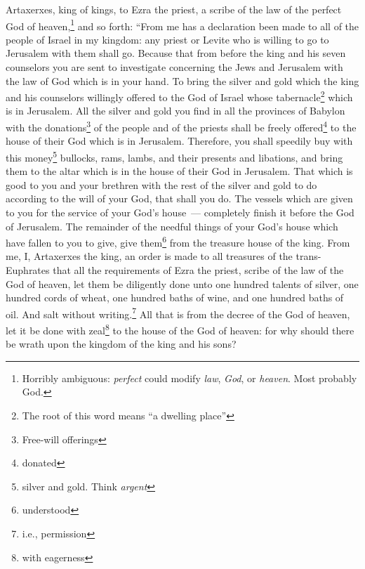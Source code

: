 
\begin{inparaenum}
     Artaxerxes, king of kings, to Ezra the priest, a scribe of the law of the perfect God of heaven,\footnote{Horribly ambiguous: \textit{perfect} could modify \textit{law}, \textit{God}, or \textit{heaven}. Most probably God.} and so forth:%
     ``From me has a declaration been made to all of the people of Israel in my kingdom: any priest or Levite who is willing to go to Jerusalem with them shall go.%
     Because that from before the king and his seven counselors you are sent to investigate concerning the Jews and Jerusalem with the law of God which is in your hand.%
     To bring the silver and gold which the king and his counselors willingly offered to the God of Israel whose tabernacle\footnote{The root of this word means ``a dwelling place''} which is in Jerusalem.%
     All the silver and gold you find in all the provinces of Babylon with the donations\footnote{Free-will offerings} of the people and of the priests shall be freely offered\footnote{donated} to the house of their God which is in Jerusalem.%
     Therefore, you shall speedily buy with this money\footnote{silver and gold. Think \textit{argent}} bullocks, rams, lambs, and their presents and libations, and bring them to the altar which is in the house of their God in Jerusalem.%
     That which is good to you and your brethren with the rest of the silver and gold to do according to the will of your God, that shall you do.%
     The vessels which are given to you for the service of your God's house~--- completely finish it before the God of Jerusalem.%
     The remainder of the needful things of your God's house which have fallen to you to give, give them\footnote{understood} from the treasure house of the king.%
     From me, I, Artaxerxes the king, an order is made to all treasures of the trans-Euphrates that all the requirements of Ezra the priest, scribe of the law of the God of heaven, let them be diligently done%
     unto one hundred talents of silver, one hundred cords of wheat, one hundred baths of wine, and one hundred baths of oil. And salt without writing.\footnote{i.e., permission}%
     All that is from the decree of the God of heaven, let it be done with zeal\footnote{with eagerness} to the house of the God of heaven: for why should there be wrath upon the kingdom of the king and his sons?%

\end{inparaenum}
